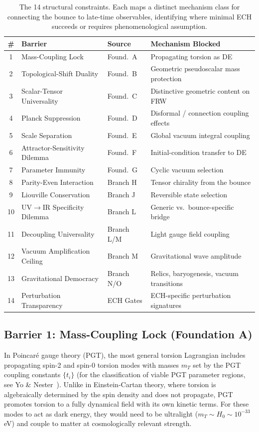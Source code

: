 \documentclass[aps,prd,twocolumn,superscriptaddress,showpacs,preprintnumbers,nofootinbib,longbibliography,floatfix]{revtex4-2}
\begin{document}
\begin{table}[tb]
\caption{\label{tab:barriers} The 14 structural constraints. Each maps a distinct mechanism class for connecting the bounce to late-time observables, identifying where minimal ECH succeeds or requires phenomenological assumption.}
\centering
\begin{tabular}{clll}
\toprule
\# & Barrier & Source & Mechanism Blocked \\
\midrule
1 & Mass-Coupling Lock & Found.\ A & Propagating torsion as DE \\
2 & Topological-Shift Duality & Found.\ B & Geometric pseudoscalar mass protection \\
3 & Scalar-Tensor Universality & Found.\ C & Distinctive geometric content on FRW \\
4 & Planck Suppression & Found.\ D & Disformal / connection coupling effects \\
5 & Scale Separation & Found.\ E & Global vacuum integral coupling \\
6 & Attractor-Sensitivity Dilemma & Found.\ F & Initial-condition transfer to DE \\
7 & Parameter Immunity & Found.\ G & Cyclic vacuum selection \\
8 & Parity-Even Interaction & Branch H & Tensor chirality from the bounce \\
9 & Liouville Conservation & Branch J & Reversible state selection \\
10 & UV$\to$IR Specificity Dilemma & Branch L & Generic vs.\ bounce-specific bridge \\
11 & Decoupling Universality & Branch L/M & Light gauge field coupling \\
12 & Vacuum Amplification Ceiling & Branch M & Gravitational wave amplitude \\
13 & Gravitational Democracy & Branch N/O & Relics, baryogenesis, vacuum transitions \\
14 & Perturbation Transparency & ECH Gates & ECH-specific perturbation signatures \\
\bottomrule
\end{tabular}
\end{table}

\subsection{Barrier 1: Mass-Coupling Lock (Foundation A)}

In Poincar\'e gauge theory (PGT), the most general torsion Lagrangian includes propagating spin-2 and spin-0 torsion modes with masses $m_T$ set by the PGT coupling constants $\{t_i\}$ (for the classification of viable PGT parameter regions, see Yo \& Nester~\cite{Yo:2002}). Unlike in Einstein-Cartan theory, where torsion is algebraically determined by the spin density and does not propagate, PGT promotes torsion to a fully dynamical field with its own kinetic terms. For these modes to act as dark energy, they would need to be ultralight ($m_T \sim H_0 \sim 10^{-33}$ eV) and couple to matter at cosmologically relevant strength.
\end{document}
